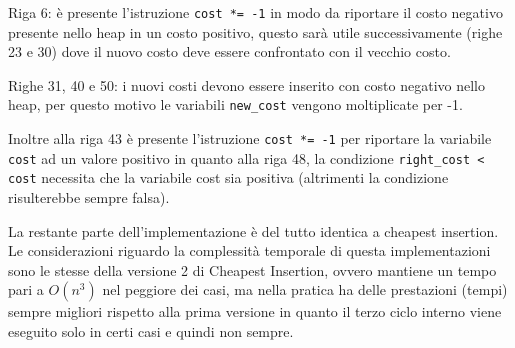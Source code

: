 \documentclass[a4paper,12pt]{report}
\begin{document}
\begin{legal}
  \item Riga 6: è presente l'istruzione \lstinline!cost *= -1! in modo da riportare il costo negativo presente nello heap in un costo positivo, questo sarà utile successivamente (righe 23 e 30) dove il nuovo costo deve essere confrontato con il vecchio costo.
  \item Righe 31, 40 e 50: i nuovi costi devono essere inserito con costo negativo nello heap, per questo motivo le variabili \lstinline!new_cost! vengono moltiplicate per -1.
  \item Inoltre alla riga 43 è presente l'istruzione \lstinline!cost *= -1! per riportare la variabile \lstinline!cost! ad un valore positivo in quanto alla riga 48, la condizione \lstinline!right_cost < cost! necessita che la variabile cost sia positiva (altrimenti la condizione risulterebbe sempre falsa).
\end{legal}
La restante parte dell'implementazione è del tutto identica a cheapest insertion. \newline
Le considerazioni riguardo la complessità temporale di questa implementazioni sono le stesse della versione 2 di Cheapest Insertion, ovvero mantiene un tempo pari a $O(n^3)$ nel peggiore dei casi, ma nella pratica ha delle prestazioni (tempi) sempre migliori rispetto alla prima versione in quanto il terzo ciclo interno viene eseguito solo in certi casi e quindi non sempre.
\end{document}
